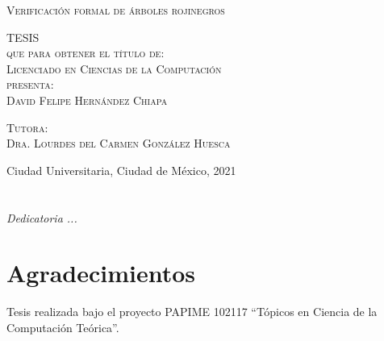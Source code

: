 \documentclass[8pt,leqno,pdflatex,spanish]{book}
\theoremstyle{plain}
\theoremstyle{definition}
\theoremstyle{remark}
\begin{document}
\begin{titlepage}
\begin{minipage}[c][0.81\textheight][t]{0.75\textwidth}
\begin{center}
{\large\scshape Verificación formal de \'arboles rojinegros}\\[.2in]

\vspace{2cm}

\textsc{\LARGE T\hspace{1.5cm}E\hspace{1.5cm}S\hspace{1.5cm}I\hspace{1.5cm}S}\\[0.5cm]
\textsc{\large que para obtener el t\'itulo de:}\\[0.5cm]
\textsc{\large Licenciado en Ciencias de la Computación}\\[0.5cm]
\textsc{\large presenta:}\\[0.5cm]
\textsc{\large {David Felipe Hern\'andez Chiapa}}\\[2cm]

\vspace{0.5cm}

{\large\scshape Tutora:\\[0.3cm] {Dra. Lourdes del Carmen Gonz\'alez 
Huesca}}\\[.2in]

\vspace{0.5cm}

\large{Ciudad Universitaria, Ciudad de México,}{ }{2021}
\end{center}
\end{minipage}
\end{titlepage}



\frontmatter
\chapter*{}
\begin{flushright}%
\emph{Dedicatoria ...}
\thispagestyle{empty}
\end{flushright}

\chapter{Agradecimientos}
Tesis realizada bajo el proyecto PAPIME 102117 ``T\'opicos en Ciencia de la Computaci\'on Te\'orica''.


\tableofcontents
\listoffigures
\renewcommand\listingscaption{C\'odigo}
\renewcommand\listoflistingscaption{\'Indice de c\'odigos}
\listoflistings


\mainmatter












\backmatter%
\end{document}
